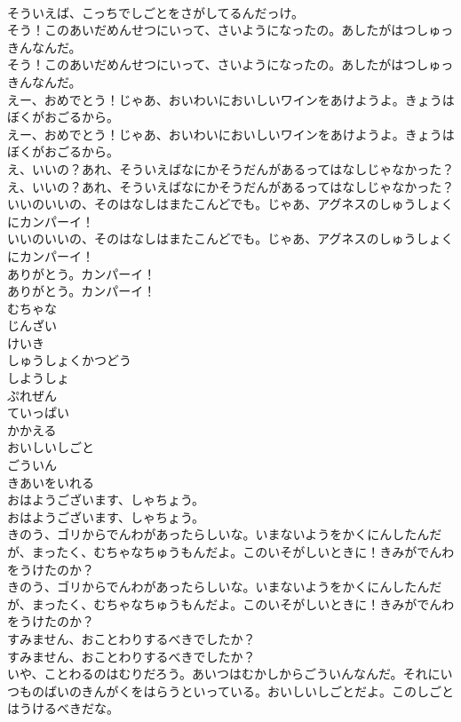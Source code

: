 \documentclass[8pt]{extreport}
\begin{document}
\begin{CJK}{UTF8}{min}
\\	そういえば、こっちでしごとをさがしてるんだっけ。
\\	そう！このあいだめんせつにいって、さいようになったの。あしたがはつしゅっきんなんだ。
\\	そう！このあいだめんせつにいって、さいようになったの。あしたがはつしゅっきんなんだ。
\\	えー、おめでとう！じゃあ、おいわいにおいしいワインをあけようよ。きょうはぼくがおごるから。
\\	えー、おめでとう！じゃあ、おいわいにおいしいワインをあけようよ。きょうはぼくがおごるから。
\\	え、いいの？あれ、そういえばなにかそうだんがあるってはなしじゃなかった？
\\	え、いいの？あれ、そういえばなにかそうだんがあるってはなしじゃなかった？
\\	いいのいいの、そのはなしはまたこんどでも。じゃあ、アグネスのしゅうしょくにカンパーイ！
\\	いいのいいの、そのはなしはまたこんどでも。じゃあ、アグネスのしゅうしょくにカンパーイ！
\\	ありがとう。カンパーイ！
\\	ありがとう。カンパーイ！
\\	むちゃな
\\	じんざい
\\	けいき
\\	しゅうしょくかつどう
\\	しようしょ
\\	ぷれぜん
\\	ていっぱい
\\	かかえる
\\	おいしいしごと
\\	ごういん
\\	きあいをいれる
\\	おはようございます、しゃちょう。
\\	おはようございます、しゃちょう。
\\	きのう、ゴリからでんわがあったらしいな。いまないようをかくにんしたんだが、まったく、むちゃなちゅうもんだよ。このいそがしいときに！きみがでんわをうけたのか？
\\	きのう、ゴリからでんわがあったらしいな。いまないようをかくにんしたんだが、まったく、むちゃなちゅうもんだよ。このいそがしいときに！きみがでんわをうけたのか？
\\	すみません、おことわりするべきでしたか？
\\	すみません、おことわりするべきでしたか？
\\	いや、ことわるのはむりだろう。あいつはむかしからごういんなんだ。それにいつものばいのきんがくをはらうといっている。おいしいしごとだよ。このしごとはうけるべきだな。

\end{CJK}
\end{document}
